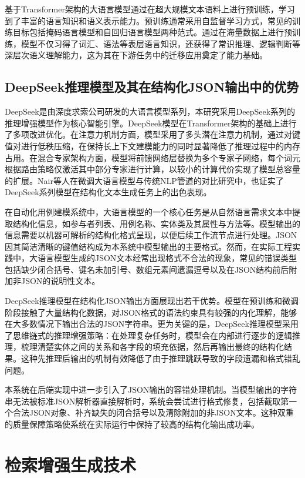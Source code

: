 基于Transformer架构的大语言模型通过在超大规模文本语料上进行预训练，学习到了丰富的语言知识和语义表示能力。预训练通常采用自监督学习方式，常见的训练目标包括掩码语言模型和自回归语言模型两种范式。通过在海量数据上进行预训练，模型不仅习得了词汇、语法等表层语言知识，还获得了常识推理、逻辑判断等深层次语义理解能力，这为其在下游任务中的迁移应用奠定了能力基础。

\subsection{DeepSeek推理模型及其在结构化JSON输出中的优势}

DeepSeek是由深度求索公司研发的大语言模型系列，本研究采用DeepSeek系列的推理增强模型作为核心智能引擎。DeepSeek模型在Transformer架构的基础上进行了多项改进优化。在注意力机制方面，模型采用了多头潜在注意力机制，通过对键值对进行低秩压缩，在保持长上下文建模能力的同时显著降低了推理过程中的内存占用。在混合专家架构方面，模型将前馈网络层替换为多个专家子网络，每个词元根据路由策略仅激活其中部分专家进行计算，以较小的计算代价实现了模型总容量的扩展。Nair等人\cite{nair2025finetuned}在微调大语言模型与传统NLP管道的对比研究中，也证实了DeepSeek系列模型在结构化文本生成任务上的出色表现。

在自动化用例建模系统中，大语言模型的一个核心任务是从自然语言需求文本中提取结构化信息，如参与者列表、用例名称、实体类及其属性与方法等。模型输出的信息需要以机器可解析的结构化格式呈现，以便后续工作流节点进行处理。JSON因其简洁清晰的键值结构成为本系统中模型输出的主要格式。然而，在实际工程实践中，大语言模型生成的JSON文本经常出现格式不合法的现象，常见的错误类型包括缺少闭合括号、键名未加引号、数组元素间遗漏逗号以及在JSON结构前后附加非JSON的说明性文本。

DeepSeek推理模型在结构化JSON输出方面展现出若干优势。模型在预训练和微调阶段接触了大量结构化数据，对JSON格式的语法约束具有较强的内化理解，能够在大多数情况下输出合法的JSON字符串。更为关键的是，DeepSeek推理模型采用了思维链式的推理增强策略\cite{deepseek2025r1}：在处理复杂任务时，模型会在内部进行逐步的逻辑推理，梳理清楚实体之间的关系和各字段的填充依据，然后再输出最终的结构化结果。这种先推理后输出的机制有效降低了由于推理跳跃导致的字段遗漏和格式错乱问题。

本系统在后端实现中进一步引入了JSON输出的容错处理机制。当模型输出的字符串无法被标准JSON解析器直接解析时，系统会尝试进行格式修复，包括截取第一个合法JSON对象、补齐缺失的闭合括号以及清除附加的非JSON文本。这种双重的质量保障策略使系统在实际运行中保持了较高的结构化输出成功率。

\section{检索增强生成技术}

